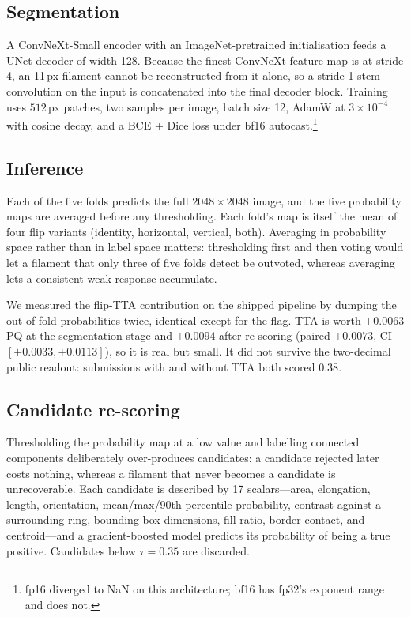 \documentclass[sigconf]{acmart}
\begin{document}
\subsection{Segmentation}
    A ConvNeXt-Small encoder \cite{convnext} with an ImageNet-pretrained initialisation feeds a UNet decoder of width 128. Because the finest ConvNeXt feature map is at stride 4, an 11\,px filament cannot be reconstructed from it alone, so a stride-1 stem convolution on the input is concatenated into the final decoder block. Training uses $512$\,px patches, two samples per image, batch size 12, AdamW at $3\times10^{-4}$ with cosine decay, and a BCE + Dice loss under bf16 autocast.\footnote{fp16 diverged to NaN on this architecture; bf16 has fp32's exponent range and does not.}

\subsection{Inference}
    Each of the five folds predicts the full $2048\times2048$ image, and the five probability maps are averaged before any thresholding. Each fold's map is itself the mean of four flip variants (identity, horizontal, vertical, both). Averaging in probability space rather than in label space matters: thresholding first and then voting would let a filament that only three of five folds detect be outvoted, whereas averaging lets a consistent weak response accumulate.

    We measured the flip-TTA contribution on the shipped pipeline by dumping the out-of-fold probabilities twice, identical except for the flag. TTA is worth $+0.0063$ PQ at the segmentation stage and $+0.0094$ after re-scoring (paired $+0.0073$, CI $[+0.0033, +0.0113]$), so it is real but small. It did not survive the two-decimal public readout: submissions with and without TTA both scored $0.38$.

\subsection{Candidate re-scoring}
    Thresholding the probability map at a low value and labelling connected components deliberately over-produces candidates: a candidate rejected later costs nothing, whereas a filament that never becomes a candidate is unrecoverable. Each candidate is described by 17 scalars---area, elongation, length, orientation, mean/max/90th-percentile probability, contrast against a surrounding ring, bounding-box dimensions, fill ratio, border contact, and centroid---and a gradient-boosted model predicts its probability of being a true positive. Candidates below $\tau=0.35$ are discarded.
\end{document}

